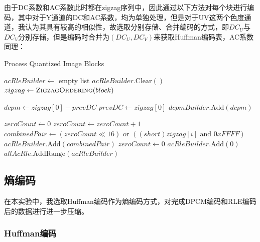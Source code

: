 \documentclass{article}
\begin{document}
由于DC系数和AC系数此时都在zigzag序列中，因此通过以下方法对每个块进行编码，其中对于Y通道的DC和AC系数，均为单独处理，但是对于UV这两个色度通道，我认为其具有较高的相似性，故选取分别存储、合并编码的方式，即$DC_U$与$DC_V$分别存储，但是编码时合并为$(DC_U,DC_V)$来获取Huffman编码表，AC系数同理：
\FloatBarrier
\begin{algorithm}
    \caption{Process Quantized Image Blocks}
    \begin{algorithmic}[1]
        \State $acRleBuilder \gets$ empty list
            \State $acRleBuilder.\text{Clear}()$
            \State $zigzag \gets \Call{ZigzagOrdering}{block}$
            
            \State $dcpm \gets zigzag[0] - prevDC$ 
            \State $prevDC \gets zigzag[0]$
            \State $dcpmBuilder.\text{Add}(dcpm)$
            
            \State $zeroCount \gets 0$ 
              
                    \State $zeroCount \gets zeroCount + 1$
                \Else
                    \State $combinedPair \gets (zeroCount \ll 16) \text{ or } ((short)zigzag[i] \text{ and } 0xFFFF)$
                    \State $acRleBuilder.\text{Add}(combinedPair)$
                    \State $zeroCount \gets 0$ 
                \EndIf
            \EndFor
            \State $acRleBuilder.\text{Add}(0)$ 
            \State $allAcRle.\text{AddRange}(acRleBuilder)$ 
        \EndFor
    \EndProcedure
    \end{algorithmic}
\end{algorithm}
\FloatBarrier

\subsection{熵编码}

在本实验中，我选取Huffman编码作为熵编码方式，对完成DPCM编码和RLE编码后的数据进行进一步压缩。

\subsubsection{Huffman编码}
\end{document}
